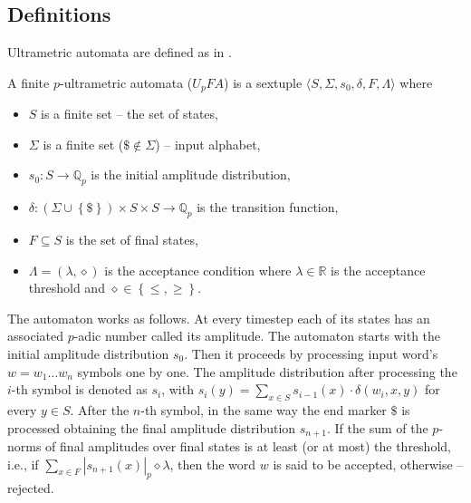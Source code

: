 \documentclass{llncs}
\begin{document}
\subsection{Definitions}
Ultrametric automata are defined as in \citep{KasparsBalodis2013}.
\begin{definition}
A finite $p$-ultrametric automata ($U_pFA$) is a sextuple %
$\langle S, \Sigma, s_0, \delta, F, \Lambda \rangle$ where
\begin{itemize}
  \item $S$ is a finite set -- the set of states,
  \item $\Sigma$ is a finite set ($\$ \notin \Sigma$) -- input alphabet,
  \item $s_0:S \rightarrow \mathbb{Q}_p$ is the initial amplitude distribution, %
  \item $\delta: \left( \Sigma \cup \left\{ \$ \right\} \right) \times S \times S \rightarrow \mathbb{Q}_p$ is the transition function,
  \item $F \subseteq S$ is the set of final states,
  \item $\Lambda = \left( \lambda, \diamond \right)$ is the acceptance condition where $\lambda \in \mathbb{R}$ is the acceptance threshold and $\diamond \in \left\{ \leq, \geq \right\}$.
\end{itemize}
The automaton works as follows.
At every timestep each of its states has an associated $p$-adic number called its amplitude.
The automaton starts with the initial amplitude distribution $s_0$.
Then it proceeds by processing input word's $w = w_1 \ldots w_n$ symbols one by one.
The amplitude distribution after processing the $i$-th symbol is denoted as $s_i$, with
$s_i(y) = \sum_{x \in S}{s_{i-1}(x) \cdot \delta \left( w_i, x, y \right) }$ for every $y \in S$.
After the $n$-th symbol, in the same way the end marker $\$$ is processed obtaining the final amplitude distribution $s_{n+1}$.
If the sum of the $p$-norms of final amplitudes over final states is at least (or at most) the threshold, i.e., if $\sum_{x \in F}{\left| s_{n+1}(x) \right|_p} \diamond \lambda$, then the word $w$ is said to be accepted, otherwise -- rejected.
\end{definition}
\end{document}

